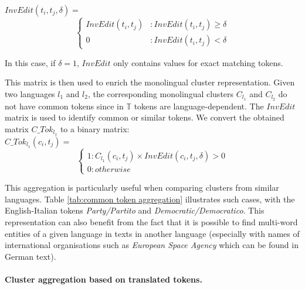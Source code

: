 \documentclass[output=paper]{langsci/langscibook}
\begin{document}
$InvEdit(t_i,t_j,\delta) =$
\[\left\{
  \begin{array}{lr}
    InvEdit(t_i,t_j) & : InvEdit(t_i,t_j) \ge \delta\\
    0 & : InvEdit(t_i,t_j) < \delta
  \end{array}
\right.
\]


In this case, if $\delta = 1$, $InvEdit$ only contains values for
exact matching tokens.

This matrix is then used to enrich the monolingual cluster
representation.  Given two languages $l_{1}$ and $l_{2}$, the
corresponding monolingual clusters $C_{l_{1}}$ and $C_{l_{2}}$ do not
have common tokens since in $\mathbb{T}$ tokens are
language-dependent. The $InvEdit$ matrix is used to identify common or
similar tokens. We convert the obtained matrix $C\_Tok_{l_{1}}$ to a
binary matrix:\\

$C\_Tok_{l_{1}}(c_i,t_j) =$
\[\left\{
  \begin{array}{lr}
    1 : C_{l_{1}}(c_i,t_j) \times InvEdit(c_i,t_j,\delta) > 0\\
    0 : otherwise
  \end{array}
\right.
\]

This aggregation is particularly useful when comparing clusters from
similar languages. Table \ref{tab:common token aggregation}
illustrates such cases, with the English-Italian tokens
\textit{Party/Partito} and \textit{Democratic/Democratico}. This
representation can also benefit from the fact that it is possible to
find multi-word entities of a given language in texts in another
language (especially with names of international organisations such as
\textit{European Space Agency} which can be found in German text).



\paragraph*{Cluster aggregation based on translated tokens.}~\\
\label{translated}

\end{document}

